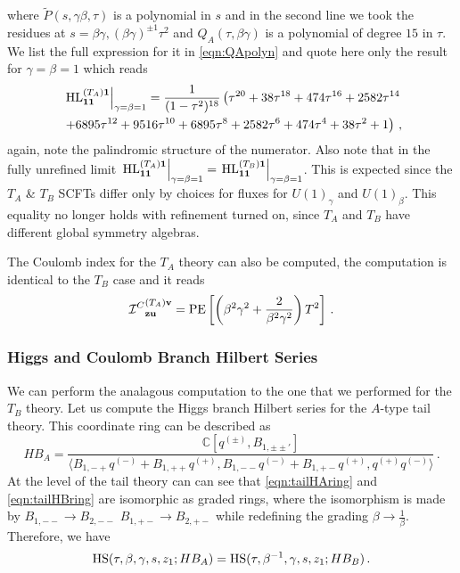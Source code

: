\documentclass[main.tex]{subfiles}
\begin{document}
where $\widetilde{P}(s,\gamma\beta,\tau)$ is a polynomial in $s$ and in the second line we took the residues at $s=\beta\gamma,(\beta\gamma)^{\pm1}\tau^2$ and $Q_A(\tau,\beta\gamma)$ is a polynomial of degree $15$ in $\tau$. We list the full expression for it in \eqref{eqn:QApolyn} and quote here only the result for $\gamma=\beta=1$ which reads
\begin{equation}
\begin{aligned}
&\left.\textrm{HL}^{(T_A)\mathbf{1}}_{\mathbf{1}\mathbf{1}}\right|_{\gamma=\beta=1}=\frac{1}{(1 -\tau^2)^{18}}\left(\tau ^{20}+38 \tau ^{18}+474 \tau ^{16}+2582 \tau ^{14}\right.\\&\left.+6895 \tau ^{12}+9516 \tau ^{10}+6895 \tau ^8+2582 \tau ^6+474 \tau ^4+38 \tau ^2+1\right)\,,
\end{aligned}
\end{equation}
again, note the palindromic structure of the numerator.
Also note that in the fully unrefined limit $\left.\textrm{HL}^{(T_A)\mathbf{1}}_{\mathbf{1}\mathbf{1}}\right|_{\gamma=\beta=1}=\left.\textrm{HL}^{(T_B)\mathbf{1}}_{\mathbf{1}\mathbf{1}}\right|_{\gamma=\beta=1}$. This is expected since the $T_A$ \& $T_B$ SCFTs differ only by choices for fluxes for $U(1)_{\gamma}$ and $U(1)_{\beta}$. This equality no longer holds with refinement turned on, since $T_A$ and $T_B$ have different global symmetry algebras.


The Coulomb index for the $T_A$ theory can also be computed, the computation is identical to the $T_B$ case and it reads
\begin{equation}
{\mathcal{I}^C}  ^{(T_A)\mathbf{v}}_{\mathbf{z}\mathbf{u}}=\operatorname{\mathrm{PE}}\left[\left(\beta^2\gamma^2+\frac{2}{\beta^2\gamma^2}\right)T^2\right]\,.
\end{equation}

\subsubsection{Higgs and Coulomb Branch Hilbert Series}
We can perform the analagous computation to the one that we performed for the $T_B$ theory. Let us compute the Higgs branch Hilbert series for the $A$-type tail theory. This coordinate ring can be described as
\begin{equation}\label{eqn:tailHAring}
HB_A=\frac{\mathbb{C}[q^{(\pm)},B_{1,\pm\pm'}]}{\langle B_{1,-+}q^{(-)}+B_{1,++}q^{(+)},B_{1,--}q^{(-)}+B_{1,+-}q^{(+)},q^{(+)}q^{(-)}\rangle}\,.
\end{equation}
At the level of the tail theory can can see that \eqref{eqn:tailHAring} and \eqref{eqn:tailHBring} are isomorphic as graded rings, where the isomorphism is made by $B_{1,--}\to B_{2,--}$ $B_{1,+-}\to B_{2,+-}$ while redefining the grading $\beta\to\frac{1}{\beta}$. Therefore, we have
\begin{equation}
\textrm{HS}(\tau,\beta,\gamma,s,z_1;HB_A)=\textrm{HS}(\tau,\beta^{-1},\gamma,s,z_1;HB_B)\,.
\end{equation}
\end{document}
